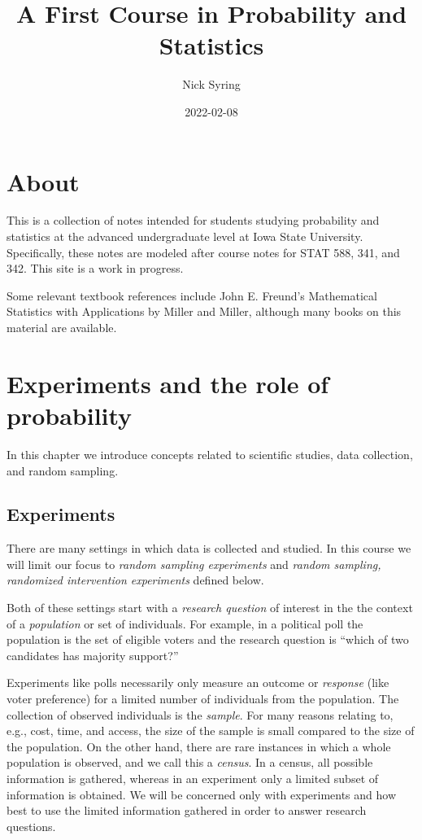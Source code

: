 \documentclass[]{book}
\title{A First Course in Probability and Statistics}
\author{Nick Syring}
\date{2022-02-08}
\begin{document}
\maketitle

{
\setcounter{tocdepth}{1}
\tableofcontents
}
\chapter{About}\label{about}

This is a collection of notes intended for students studying probability
and statistics at the advanced undergraduate level at Iowa State
University. Specifically, these notes are modeled after course notes for
STAT 588, 341, and 342. This site is a work in progress.

Some relevant textbook references include John E. Freund's Mathematical
Statistics with Applications by Miller and Miller, although many books
on this material are available.

\chapter{Experiments and the role of
probability}\label{experiments-and-the-role-of-probability}

In this chapter we introduce concepts related to scientific studies,
data collection, and random sampling.

\section{Experiments}\label{experiments}

There are many settings in which data is collected and studied. In this
course we will limit our focus to \emph{random sampling experiments} and
\emph{random sampling, randomized intervention experiments} defined
below.

Both of these settings start with a \emph{research question} of interest
in the the context of a \emph{population} or set of individuals. For
example, in a political poll the population is the set of eligible
voters and the research question is ``which of two candidates has
majority support?''

Experiments like polls necessarily only measure an outcome or
\emph{response} (like voter preference) for a limited number of
individuals from the population. The collection of observed individuals
is the \emph{sample}. For many reasons relating to, e.g., cost, time,
and access, the size of the sample is small compared to the size of the
population. On the other hand, there are rare instances in which a whole
population is observed, and we call this a \emph{census}. In a census,
all possible information is gathered, whereas in an experiment only a
limited subset of information is obtained. We will be concerned only
with experiments and how best to use the limited information gathered in
order to answer research questions.
\end{document}
